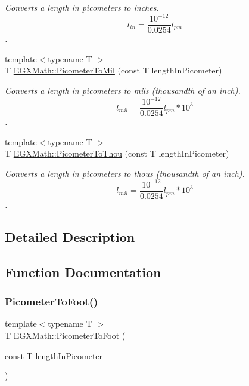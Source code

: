 \begin{DoxyCompactItemize}
\begin{DoxyCompactList}\small\item\em Converts a length in picometers to inches. \[ l_{in}= \frac{10^{-12}}{0.0254} l_{pm} \]. \end{DoxyCompactList}\item 
{\footnotesize template$<$typename T $>$ }\\T \mbox{\hyperlink{group___e_g_x_math-_conversions-_length_conversions-_picometer-_imperial_ga727778c82b4049ff45091f492993150d}{E\+G\+X\+Math\+::\+Picometer\+To\+Mil}} (const T length\+In\+Picometer)
\begin{DoxyCompactList}\small\item\em Converts a length in picometers to mils (thousandth of an inch). \[ l_{mil}= \frac{10^{-12}}{0.0254} l_{pm} * 10^{3} \]. \end{DoxyCompactList}\item 
{\footnotesize template$<$typename T $>$ }\\T \mbox{\hyperlink{group___e_g_x_math-_conversions-_length_conversions-_picometer-_imperial_gabf48007bf90e25f6d23f847101fd35f1}{E\+G\+X\+Math\+::\+Picometer\+To\+Thou}} (const T length\+In\+Picometer)
\begin{DoxyCompactList}\small\item\em Converts a length in picometers to thous (thousandth of an inch). \[ l_{mil}= \frac{10^{-12}}{0.0254} l_{pm} * 10^{3} \]. \end{DoxyCompactList}\end{DoxyCompactItemize}


\subsection{Detailed Description}


\subsection{Function Documentation}
\mbox{\label{group___e_g_x_math-_conversions-_length_conversions-_picometer-_imperial_gae83808c99fe5c49c54717302f667ff46}} 
\subsubsection{\texorpdfstring{Picometer\+To\+Foot()}{PicometerToFoot()}}
{\footnotesize\ttfamily template$<$typename T $>$ \\
T E\+G\+X\+Math\+::\+Picometer\+To\+Foot (\begin{DoxyParamCaption}\item[{const T}]{length\+In\+Picometer }\end{DoxyParamCaption})}



